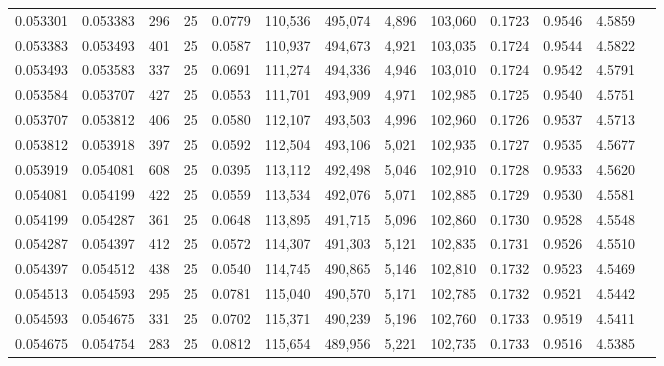 \begin{tabular}{rrrrrrrrrrrrr}
0.053301 & 0.053383 &   296 &  25 &                                     0.0779 & 110,536 & 495,074 &   4,896 & 103,060 & 0.1723 & 0.9546 & 4.5859 \\
0.053383 & 0.053493 &   401 &  25 &                                     0.0587 & 110,937 & 494,673 &   4,921 & 103,035 & 0.1724 & 0.9544 & 4.5822 \\
0.053493 & 0.053583 &   337 &  25 &                                     0.0691 & 111,274 & 494,336 &   4,946 & 103,010 & 0.1724 & 0.9542 & 4.5791 \\
0.053584 & 0.053707 &   427 &  25 &                                     0.0553 & 111,701 & 493,909 &   4,971 & 102,985 & 0.1725 & 0.9540 & 4.5751 \\
0.053707 & 0.053812 &   406 &  25 &                                     0.0580 & 112,107 & 493,503 &   4,996 & 102,960 & 0.1726 & 0.9537 & 4.5713 \\
0.053812 & 0.053918 &   397 &  25 &                                     0.0592 & 112,504 & 493,106 &   5,021 & 102,935 & 0.1727 & 0.9535 & 4.5677 \\
0.053919 & 0.054081 &   608 &  25 &                                     0.0395 & 113,112 & 492,498 &   5,046 & 102,910 & 0.1728 & 0.9533 & 4.5620 \\
0.054081 & 0.054199 &   422 &  25 &                                     0.0559 & 113,534 & 492,076 &   5,071 & 102,885 & 0.1729 & 0.9530 & 4.5581 \\
0.054199 & 0.054287 &   361 &  25 &                                     0.0648 & 113,895 & 491,715 &   5,096 & 102,860 & 0.1730 & 0.9528 & 4.5548 \\
0.054287 & 0.054397 &   412 &  25 &                                     0.0572 & 114,307 & 491,303 &   5,121 & 102,835 & 0.1731 & 0.9526 & 4.5510 \\
0.054397 & 0.054512 &   438 &  25 &                                     0.0540 & 114,745 & 490,865 &   5,146 & 102,810 & 0.1732 & 0.9523 & 4.5469 \\
0.054513 & 0.054593 &   295 &  25 &                                     0.0781 & 115,040 & 490,570 &   5,171 & 102,785 & 0.1732 & 0.9521 & 4.5442 \\
0.054593 & 0.054675 &   331 &  25 &                                     0.0702 & 115,371 & 490,239 &   5,196 & 102,760 & 0.1733 & 0.9519 & 4.5411 \\
0.054675 & 0.054754 &   283 &  25 &                                     0.0812 & 115,654 & 489,956 &   5,221 & 102,735 & 0.1733 & 0.9516 & 4.5385 \\

\end{tabular}
